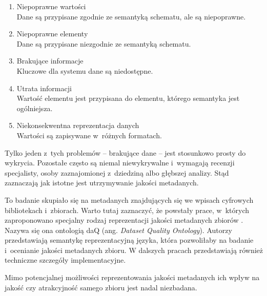 	\begin{enumerate}
		\item Niepoprawne wartości \\
		Dane są przypisane zgodnie ze semantyką schematu, ale są niepoprawne.

		\item Niepoprawne elementy \\
		Dane są przypisane niezgodnie ze semantyką schematu.

		\item Brakujące informacje \\
		Kluczowe dla systemu dane są niedostępne.

		\item Utrata informacji \\
		Wartość elementu jest przypisana do elementu, którego semantyka jest ogólniejsza.

		\item Niekonsekwentna reprezentacja danych \\
		Wartości są zapisywane w~różnych formatach.
	\end{enumerate}

	Tylko jeden z~tych problemów -- brakujące dane -- jest stosunkowo prosty do wykrycia.
	Pozostałe często są niemal niewykrywalne i~wymagają recenzji specjalisty, osoby zaznajomionej z~dziedziną albo głębszej analizy.
	Stąd zaznaczają jak istotne jest utrzymywanie jakości metadanych.

	To badanie skupiało się na metadanych znajdujących się we wpisach cyfrowych bibliotekach i~zbiorach.
	Warto tutaj zaznaczyć, że powstały prace, w~których zaproponowano specjalny rodzaj reprezentacji jakości metadanych zbiorów \cite{debattista2014daq}.
	Nazywa się ona ontologią daQ (ang. \emph{Dataset Quality Ontology}).
	Autorzy przedstawiają semantykę reprezentacyjną języka, która pozwoliłaby na badanie i~ocenianie jakości metadanych zbioru.
	W dalszych pracach \cite{debattista2014representing} przedstawiają również techniczne szczegóły implementacyjne.

	Mimo potencjalnej możliwości reprezentowania jakości metadanych ich wpływ na jakość czy atrakcyjność samego zbioru jest nadal niezbadana.
